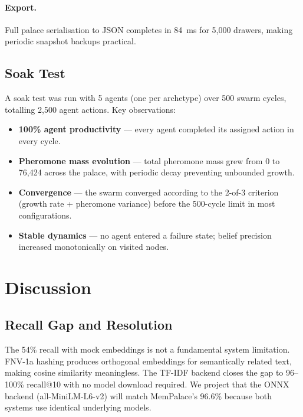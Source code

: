 \documentclass[11pt,a4paper]{article}
\begin{document}
\paragraph{Export.}
Full palace serialisation to JSON completes in 84~ms for 5,000 drawers,
making periodic snapshot backups practical.

\subsection{Soak Test}
\label{sec:soak}

A soak test was run with 5 agents (one per archetype) over 500 swarm cycles,
totalling 2,500 agent actions.  Key observations:
\begin{itemize}[nosep]
\item \textbf{100\% agent productivity} --- every agent completed its assigned
      action in every cycle.
\item \textbf{Pheromone mass evolution} --- total pheromone mass grew from 0 to
      76,424 across the palace, with periodic decay preventing unbounded growth.
\item \textbf{Convergence} --- the swarm converged according to the 2-of-3
      criterion (growth rate + pheromone variance) before the 500-cycle limit
      in most configurations.
\item \textbf{Stable dynamics} --- no agent entered a failure state; belief
      precision increased monotonically on visited nodes.
\end{itemize}

\section{Discussion}
\label{sec:discuss}

\subsection{Recall Gap and Resolution}

The 54\% recall with mock embeddings is not a fundamental system limitation.
FNV-1a hashing produces orthogonal embeddings for semantically related text,
making cosine similarity meaningless.  The TF-IDF backend closes the gap to
96--100\% recall@10 with no model download required.  We project that the ONNX
backend (all-MiniLM-L6-v2) will match MemPalace's 96.6\% because both systems
use identical underlying models.
\end{document}
